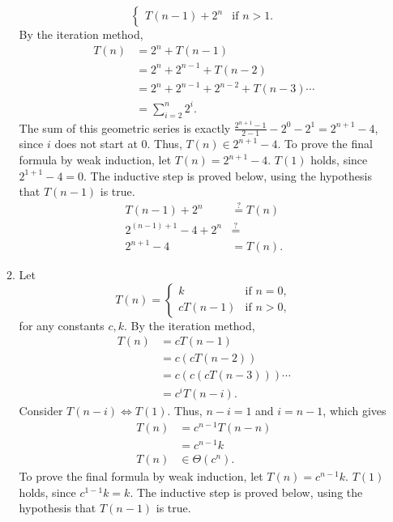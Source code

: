\documentclass[12pt]{article}
\begin{document}
\begin{enumerate}
\begin{enumerate}
\[\begin{cases}
                T(n - 1) + 2^{n} &\text{if } n > 1.
            \end{cases}
        \] By the iteration method,
        \begin{align*}
            T(n) &= 2^{n} + T(n - 1) \\
            &= 2^{n} + 2^{n - 1} + T(n - 2) \\
            &= 2^{n} + 2^{n - 1} + 2^{n - 2} + T(n - 3) \cdots \\
            &= \sum_{i = 2}^{n} 2^{i}.
        \end{align*}
        The sum of this geometric series is exactly $\frac{2^{n + 1} - 1}{2 - 1} - 2^{0} - 2^{1} = 2^{n + 1} - 4$, since $i$ does not start at $0$. Thus, $T(n) \in 2^{n + 1} - 4$. To prove the final formula by weak induction, let $T(n) = 2^{n + 1} - 4$. $T(1)$ holds, since $2^{1 + 1} - 4 = 0$. The inductive step is proved below, using the hypothesis that $T(n - 1)$ is true.
        \begin{align*}
            T(n - 1) + 2^{n} &\stackrel{?}{=} T(n) \\
            2^{(n - 1) + 1} - 4 + 2^{n} &\stackrel{?}{=} \\
            2^{n + 1} - 4 &= T(n).
        \end{align*}
        \item\label{ex:4c} Let \[
            T(n) = \begin{cases}
                k &\text{if } n = 0, \\
                cT(n - 1) &\text{if } n > 0,
            \end{cases}
        \] for any constants $c, k$. By the iteration method,
        \begin{align*}
            T(n) &= cT(n - 1) \\
            &= c(cT(n - 2)) \\
            &= c(c(cT(n - 3))) \cdots \\
            &= c^{i} T(n - i).
        \end{align*}
        Consider $T(n - i) \Leftrightarrow T(1)$. Thus, $n - i = 1$ and $i = n - 1$, which gives
        \begin{align*}
            T(n) &= c^{n - 1} T(n - n)  \\
            &= c^{n - 1} k \\
            T(n) &\in \Theta(c^{n}).
        \end{align*}
        To prove the final formula by weak induction, let $T(n) = c^{n - 1} k$. $T(1)$ holds, since $c^{1 - 1} k = k$. The inductive step is proved below, using the hypothesis that $T(n - 1)$ is true.

\end{enumerate}
\end{enumerate}
\end{document}
